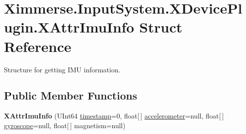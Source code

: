 \hypertarget{struct_ximmerse_1_1_input_system_1_1_x_device_plugin_1_1_x_attr_imu_info}{}\section{Ximmerse.\+Input\+System.\+X\+Device\+Plugin.\+X\+Attr\+Imu\+Info Struct Reference}
\label{struct_ximmerse_1_1_input_system_1_1_x_device_plugin_1_1_x_attr_imu_info}


Structure for getting I\+MU information.  


\subsection*{Public Member Functions}
\begin{DoxyCompactItemize}
\item 
\mbox{\label{struct_ximmerse_1_1_input_system_1_1_x_device_plugin_1_1_x_attr_imu_info_a536a27aa65f419a8cc0b2a3fedb9c596}} 
{\bfseries X\+Attr\+Imu\+Info} (U\+Int64 \mbox{\hyperlink{struct_ximmerse_1_1_input_system_1_1_x_device_plugin_1_1_x_attr_imu_info_aad6adb5645c06975ae547b12bf85c9dd}{timestamp}}=0, float\mbox{[}$\,$\mbox{]} \mbox{\hyperlink{struct_ximmerse_1_1_input_system_1_1_x_device_plugin_1_1_x_attr_imu_info_a79b918c53054b60a5f3babe8be88cb9b}{accelerometer}}=null, float\mbox{[}$\,$\mbox{]} \mbox{\hyperlink{struct_ximmerse_1_1_input_system_1_1_x_device_plugin_1_1_x_attr_imu_info_afc55807092069c3d5e15faff401702d4}{gyroscope}}=null, float\mbox{[}$\,$\mbox{]} magnetism=null)
\end{DoxyCompactItemize}
